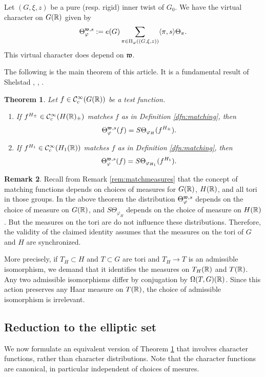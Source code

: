 \documentclass{article}
\newtheorem{thm}{Theorem}[subsection]
\theoremstyle{definition}
\newtheorem{rem}[thm]{Remark}
\numberwithin{equation}{section}
\renewcommand{\-}{\hyp{}}
\begin{document}
Let $(G,\xi,z)$ be a pure (resp. rigid) inner twist of $G_0$. We have the virtual character on $G(\mathbb{R})$ given by
\[ \Theta_{\varphi}^{\mathfrak{w},s} := e(G)\sum_{\pi \in \Pi_\varphi((G,\xi,z))} \langle\pi,s\rangle\Theta_\pi. \]
This virtual character does depend on $\mathfrak{w}$.

The following is the main theorem of this article. It is a fundamental result of Shelstad \cite{She82}, \cite{SheTE2}, \cite{SheTE3}.
\begin{thm} \label{thm:main1}
Let $f \in \mathcal{C}^\infty_c(G(\mathbb{R}))$ be a test function.
\begin{enumerate}
	\item If $f^{H_\pm} \in \mathcal{C}^\infty_c(H(\mathbb{R})_\pm)$ matches $f$ as in Definition \ref{dfn:matching}, then
	\[ \Theta_\varphi^{\mathfrak{w},s}(f) = S\Theta_{\varphi_H}(f^{H_\pm}). \]
	\item If $f^{H_1} \in \mathcal{C}^\infty_c(H_1(\mathbb{R}))$ matches $f$ as in Definition \ref{dfn:matching}, then
	\[ \Theta_\varphi^{\mathfrak{w},s}(f) = S\Theta_{\varphi_{H_1}}(f^{H_1}). \]
\end{enumerate}
\end{thm}

\begin{rem} \label{rem:measures}
	Recall from Remark \ref{rem:matchmeasures} that the concept of matching functions depends on choices of measures for $G(\mathbb{R})$, $H(\mathbb{R})$, and all tori in those groups. In the above theorem the distribution $\Theta^{\mathfrak{w},s}_\varphi$ depends on the choice of measure on $G(\mathbb{R})$, and $S\Theta_{\varphi_H}$ depends on the choice of measure on $H(\mathbb{R})$. But the measures on the tori are do not influence these distributions. Therefore, the validity of the claimed identity assumes that the measures on the tori of $G$ and $H$ are synchronized.

	More precisely, if $T_H \subset H$ and $T \subset G$ are tori and $T_H \to T$ is an admissible isomorphism, we demand that it identifies the measures  on $T_H(\mathbb{R})$ and $T(\mathbb{R})$. Any two admissible isomorphisms differ by conjugation by $\Omega(T,G)(\mathbb{R})$. Since this action preserves any Haar measure on $T(\mathbb{R})$, the choice of admissible isomorphism is irrelevant.
\end{rem}

\subsection{Reduction to the elliptic set}

We now formulate an equivalent version of Theorem \ref{thm:main1} that involves character functions, rather than character distributions. Note that the character functions are canonical, in particular independent of choices of mesures.
\end{document}

